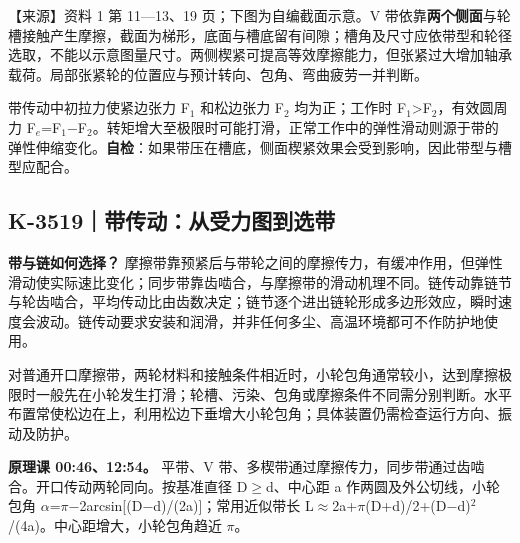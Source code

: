 \documentclass[zihao=5,a4paper,UTF8,fontset=fandol]{ctexart}
\begin{document}
【来源】资料 1 第 11—13、19 页；下图为自编截面示意。V 带依靠\textbf{两个侧面}与轮槽接触产生摩擦，截面为梯形，底面与槽底留有间隙；槽角及尺寸应依带型和轮径选取，不能以示意图量尺寸。两侧楔紧可提高等效摩擦能力，但张紧过大增加轴承载荷。局部张紧轮的位置应与预计转向、包角、弯曲疲劳一并判断。


\begin{center}
\end{center}


带传动中初拉力使紧边张力 F$_{1}$ 和松边张力 F$_{2}$ 均为正；工作时 F$_{1}$>F$_{2}$，有效圆周力 F$_{e}$=F$_{1}$$-$F$_{2}$。转矩增大至极限时可能打滑，正常工作中的弹性滑动则源于带的弹性伸缩变化。\textbf{自检}：如果带压在槽底，侧面楔紧效果会受到影响，因此带型与槽型应配合。





\subsection{K-3519｜带传动：从受力图到选带}
\label{k-3519}

\textbf{带与链如何选择？} 摩擦带靠预紧后与带轮之间的摩擦传力，有缓冲作用，但弹性滑动使实际速比变化；同步带靠齿啮合，与摩擦带的滑动机理不同。链传动靠链节与轮齿啮合，平均传动比由齿数决定；链节逐个进出链轮形成多边形效应，瞬时速度会波动。链传动要求安装和润滑，并非任何多尘、高温环境都可不作防护地使用。


对普通开口摩擦带，两轮材料和接触条件相近时，小轮包角通常较小，达到摩擦极限时一般先在小轮发生打滑；轮槽、污染、包角或摩擦条件不同需分别判断。水平布置常使松边在上，利用松边下垂增大小轮包角；具体装置仍需检查运行方向、振动及防护。


\textbf{原理课 00:46、12:54。} 平带、V 带、多楔带通过摩擦传力，同步带通过齿啮合。开口传动两轮同向。按基准直径 D$\ge$d、中心距 a 作两圆及外公切线，小轮包角 $\alpha$=$\pi$$-$2arcsin[(D$-$d)/(2a)]；常用近似带长 L$\approx$2a+$\pi$(D+d)/2+(D$-$d)$^{2}$/(4a)。中心距增大，小轮包角趋近 $\pi$。
\end{document}
